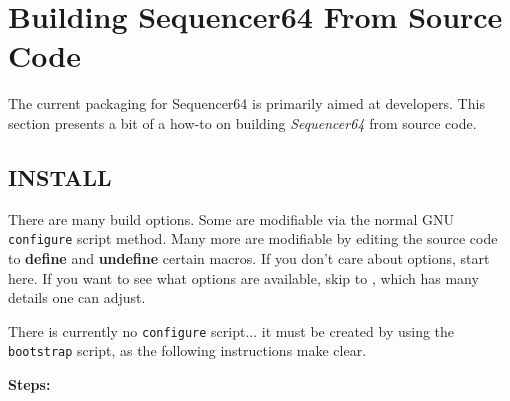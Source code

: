 %
%
%

\section{Building Sequencer64 From Source Code}
\label{sec:seq64_build}

   The current packaging for Sequencer64 is primarily aimed at developers.
   This section presents a bit of a how-to on building \textsl{Sequencer64}
   from source code.

\subsection{INSTALL}
\label{subsec:seq64_build_install}

   There are many build options.  Some are modifiable via the normal GNU
   \texttt{configure} script method.  Many more are modifiable by
   editing the source code to \textbf{define} and \textbf{undefine} certain
   macros.  If you don't care about options, start here.  If you want to
   see what options are available, skip to
   , which has many details one can
   adjust.

   There is currently no \texttt{configure} script... it must be created
   by using the \texttt{bootstrap} script, as the following instructions make
   clear.

   \textbf{Steps:}

